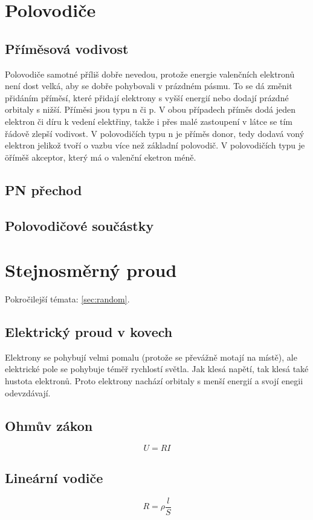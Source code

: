 \documentclass[titlepage]{book}
\begin{document}
\chapter{Polovodiče}
\section{Příměsová vodivost}
Polovodiče samotné příliš dobře nevedou, protože energie valenčních elektronů není dost velká, aby se dobře pohybovali v prázdném pásmu. To se dá změnit přidáním příměsí, které přidají elektrony s vyšší energií nebo dodají prázdné orbitaly s nižší. Příměsi jsou typu n či p. V obou případech příměs dodá jeden elektron či díru k vedení elektřiny, takže i přes malé zastoupení v látce se tím řádově zlepší vodivost. V polovodičích typu n je příměs donor, tedy dodavá voný elektron jelikož tvoří o vazbu více než základní polovodič. V polovodičích typu je öříměš akceptor, který má o valenční eketron méně. 
\section{PN přechod}

\section{Polovodičové součástky}

\chapter{Stejnosměrný proud}
Pokročilejší témata: \ref{sec:random}.
\section{Elektrický proud v kovech}
Elektrony se pohybují velmi pomalu (protože se převážně motají na místě), ale elektrické pole se pohybuje téměř rychlostí světla. Jak klesá napětí, tak klesá také hustota elektronů. Proto elektrony nachází orbitaly s menší energií a svojí enegii odevzdávají.
\section{Ohmův zákon}
\begin{equation}
U = RI
\end{equation}
\section{Lineární vodiče}
\begin{equation}
R = \rho \frac{l}{S}
\end{equation}
\end{document}

